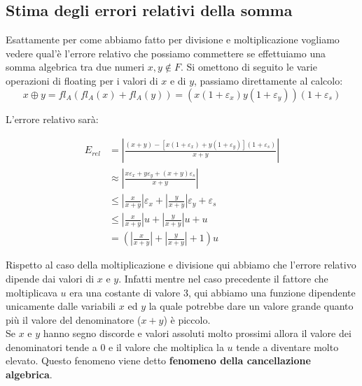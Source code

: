 \documentclass[12pt, a4paper]{book}
\theoremstyle{definition}
\begin{document}
\subsection{Stima degli errori relativi della somma}
\begin{flushleft}
Esattamente per come abbiamo fatto per divisione e moltiplicazione vogliamo vedere qual'è l'errore relativo che possiamo commettere se effettuiamo una somma algebrica tra due numeri $x,y \notin F$. 
Si omettono di seguito le varie operazioni di floating per i valori di $x$ e di $y$,  passiamo direttamente al calcolo: 
\[ x \oplus y = fl_{A}(fl_{A}(x) + fl_{A}(y)) = (x(1+\varepsilon_{x})y(1+\varepsilon_{y}))(1+\varepsilon_{s}) \]

L'errore relativo sarà: 

\begin{equation} \label{}
	\begin{split}
		E_{rel}  &=  \displaystyle\left\lvert \frac{(x+y) - [x(1+ \varepsilon_{x}) + y(1+\varepsilon_{y})](1+\varepsilon_{s}) }{x+y}   \right\rvert \\
					&\approx \displaystyle\left\lvert \frac{x\varepsilon_{x} + y\varepsilon_{y} + (x+y)\varepsilon_{s}}{x+y}   \right\rvert \\
					&\leq  \displaystyle\left\lvert \frac{x}{x+y} \right\rvert \varepsilon_{x } + \displaystyle\left\lvert \frac{y}{x+y} \right\rvert \varepsilon_{y} + \varepsilon_{s} \\
					&\leq \displaystyle\left\lvert \frac{x}{x+y} \right\rvert u + \displaystyle\left\lvert \frac{y}{x+y} \right\rvert u +  u\\
					&= \left(\displaystyle\left\lvert \frac{x}{x+y} \right\rvert +  \displaystyle\left\lvert \frac{y}{x+y} \right\rvert + 1 \right)u
	\end{split}
\end{equation}

Rispetto al caso della moltiplicazione e divisione qui abbiamo che l'errore relativo dipende dai valori di $x$ e $y$. Infatti mentre nel caso precedente il fattore che moltiplicava $u$ era una costante di valore 3, qui abbiamo una funzione dipendente unicamente dalle variabili $x$ ed $y$ la quale potrebbe dare un valore grande quanto più il valore del denominatore ($x+y$) è piccolo. \\
Se $x$ e $y$ hanno segno discorde e valori  assoluti molto prossimi allora il valore dei denominatori tende a 0 e il valore che moltiplica la $u$ tende a diventare molto elevato.
Questo fenomeno viene detto \textbf{fenomeno della cancellazione algebrica}.  
\end{flushleft}
\end{document}
